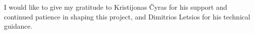 I would like to give my gratitude to Kristijonas \v{C}yras for his support and continued patience in shaping this project, and Dimitrios Letsios for his technical guidance. 